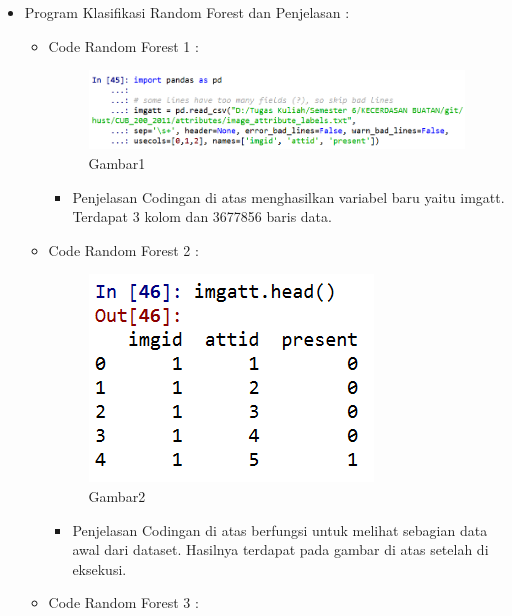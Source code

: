 \begin{enumerate}
\begin{itemize}
\begin{itemize}
\par
\par
\item Program Klasifikasi Random Forest dan Penjelasan :
\begin{itemize}
\item Code Random Forest 1 :
\par
\begin{figure}[ht]
\centering
\includegraphics[scale=0.7]{figures/andi/RF1.PNG}
\caption{Gambar1}
\label{contoh}
\end{figure}
\par
\begin{itemize}
\item Penjelasan Codingan di atas menghasilkan variabel baru yaitu imgatt. Terdapat 3 kolom dan 3677856 baris data.
\par 
\par
\end{itemize}
\item Code Random Forest 2 :
\par
\begin{figure}[ht]
\centering
\includegraphics[scale=0.7]{figures/andi/RF2.PNG}
\caption{Gambar2}
\label{contoh}
\end{figure}
\par
\begin{itemize}
\item Penjelasan  Codingan di atas berfungsi untuk melihat sebagian data awal dari dataset. Hasilnya terdapat pada gambar di atas setelah di eksekusi.
\par
\par
\end{itemize}
\item Code Random Forest 3 :

\end{itemize}
\end{itemize}
\end{itemize}
\end{enumerate}

